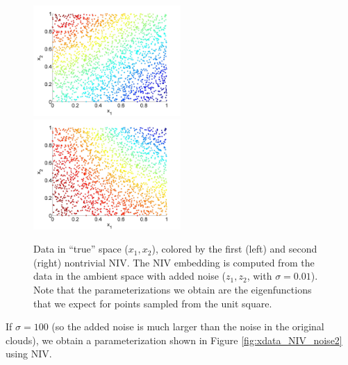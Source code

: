 \documentclass[12pt]{article}
\begin{document}
\begin{figure}[htb]
\includegraphics[width=0.5\textwidth]{xdata_noise1_colored_NIV1}
\includegraphics[width=0.5\textwidth]{xdata_noise1_colored_NIV2}
\caption{Data in ``true'' space ($x_1, x_2$), colored by the first (left) and second (right) nontrivial NIV. The NIV embedding is computed from the data in the ambient space with added noise ($z_1, z_2$, with $\sigma = 0.01$). Note that the parameterizations we obtain are the eigenfunctions that we expect for points sampled from the unit square.}
\label{fig:xdata_NIV_noise1}
\end{figure}

If $\sigma = 100$ (so the added noise is much larger than the noise in the original clouds), we obtain a parameterization shown in Figure \ref{fig:xdata_NIV_noise2} using NIV.
\end{document}
